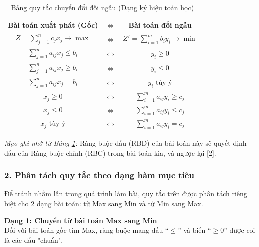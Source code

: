 \begin{table}[htbp]
    \centering
    \renewcommand{\arraystretch}{1.5}
    \begin{tabular}{|c|c|c|}
        \hline
        \textbf{Bài toán xuất phát (Gốc)} & $\Leftrightarrow$ & \textbf{Bài toán đối ngẫu} \\
        \hline
        \textbf{$Z = \sum_{j=1}^{n} c_j x_j \rightarrow \max$} & $\Leftrightarrow$ & \textbf{$Z' = \sum_{i=1}^{m} b_i y_i \rightarrow \min$} \\
        \hline
        $\sum_{j=1}^{n} a_{ij} x_j \le b_i$ & $\Leftrightarrow$ & $y_i \ge 0$ \\
        $\sum_{j=1}^{n} a_{ij} x_j \ge b_i$ & $\Leftrightarrow$ & $y_i \le 0$ \\
        $\sum_{j=1}^{n} a_{ij} x_j = b_i$ & $\Leftrightarrow$ & $y_i$ tùy ý \\
        \hline
        $x_j \ge 0$ & $\Leftrightarrow$ & $\sum_{i=1}^{m} a_{ij} y_i \ge c_j$ \\
        $x_j \le 0$ & $\Leftrightarrow$ & $\sum_{i=1}^{m} a_{ij} y_i \le c_j$ \\
        $x_j$ tùy ý & $\Leftrightarrow$ & $\sum_{i=1}^{m} a_{ij} y_i = c_j$ \\
        \hline
    \end{tabular}
    \caption{Bảng quy tắc chuyển đổi đối ngẫu (Dạng ký hiệu toán học)}
    \label{tab:doi_ngau_ky_hieu}
\end{table}

\textit{Mẹo ghi nhớ từ Bảng \ref{tab:doi_ngau_ky_hieu}:} Ràng buộc dấu (RBD) của bài toán này sẽ quyết định dấu của Ràng buộc chính (RBC) trong bài toán kia, và ngược lại [2].

\vspace{0.3cm}
\subsubsection{2. Phân tách quy tắc theo dạng hàm mục tiêu}
Để tránh nhầm lẫn trong quá trình làm bài, quy tắc trên được phân tách riêng biệt cho 2 dạng bài toán: từ Max sang Min và từ Min sang Max.

\textbf{Dạng 1: Chuyển từ bài toán Max sang Min} \\
Đối với bài toán gốc tìm Max, ràng buộc mang dấu ``$\le$'' và biến ``$\ge 0$'' được coi là các dấu "chuẩn".

